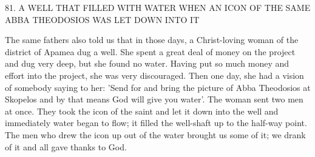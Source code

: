 81. A WELL THAT FILLED WITH WATER
WHEN AN ICON OF THE SAME
ABBA THEODOSIOS WAS LET DOWN INTO IT

The same fathers also told us that in those days, a Christ-loving
woman of the district of Apamea dug a well. She spent a great deal
of money on the project and dug very deep, but she found no water.
Having put so much money and effort into the project, she was very
discouraged. Then one day, she had a vision of somebody saying to
her: 'Send for and bring the picture of Abba Theodosios at
Skopelos and by that means God will give you water'. The woman
sent two men at once. They took the icon of the saint and let it
down into the well and immediately water began to flow; it filled the
well-shaft up to the half-way point. The men who drew the icon up
out of the water brought us some of it; we drank of it and all gave
thanks to God.

